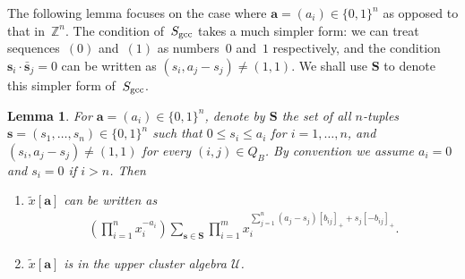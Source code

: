 \documentclass[pdftex]{sigma}
\numberwithin{equation}{section}
\newtheorem{Lemma}[Theorem]{Lemma}
\begin{document}
The following lemma focuses on the case where $\mathbf{a}=(a_i)\in \{0,1\}^n$ as opposed to that in~$\mathbb{Z}^n$. The condition of~$S_{\rm gcc}$ takes a much simpler form: we can treat sequences~$(0)$ and~$(1)$ as numbers~$0$ and~$1$ respectively, and the condition $\mathbf{s}_i\cdot\bar{\mathbf{s}}_j=0$ can be written as $(s_i,a_j-s_j)\neq(1,1)$. We shall use $\mathbf{S}$ to denote this simpler form of~$S_{\rm gcc}$.

\begin{Lemma}\label{lemma:01}
For $\mathbf{a}=(a_i)\in \{0,1\}^n$, denote by
$\mathbf{S}$ the set of all $n$-tuples $\mathbf{s}=(s_1,\dots,s_n)\in\{0,1\}^n$ such that
$0\le s_i\le a_i$ for $i=1,\dots, n$, and $(s_i,a_j-s_j)\neq(1,1)$ for every $(i,j)\in Q_B$.
 By convention we assume $a_i=0$ and $s_i=0$ if $i>n$.
Then
\begin{enumerate}\itemsep=0pt
\item[$(i)$] $\tilde{x}[\mathbf{a}]$ can be written as
\begin{gather}\label{df:x[a]}
\left(\prod_{i=1}^n  x_i^{-a_i}\right)\sum_{\mathbf{s}\in \mathbf{S}}\prod_{i=1}^m
x_i^{\sum\limits_{j=1}^n (a_j-s_j)[b_{ij}]_+ + s_j[-b_{ij}]_+}.
\end{gather}

\item[$(ii)$] $\tilde{x}[\mathbf{a}]$ is in the upper cluster algebra $\mathcal{U}$.
\end{enumerate}
\end{Lemma}
\end{document}
